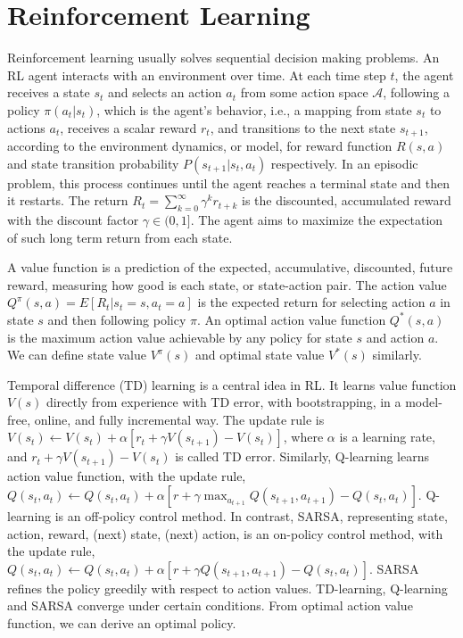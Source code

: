 \section{Reinforcement Learning}

Reinforcement learning usually solves sequential decision making problems. An RL agent interacts with an environment over time. At each time step $t$, the agent receives a state $s_t$ and selects an action $a_t$ from some action space $\mathcal{A}$, following a policy $\pi(a_t|s_t)$, which is the agent's behavior, i.e., a mapping from state $s_t$ to actions $a_t$, receives a scalar reward $r_t$, and transitions to the next state $s_{t+1}$, according to the environment dynamics, or model, for reward function $R(s,a)$ and state transition probability $P(s_{t+1}|s_t, a_t)$ respectively. In an episodic problem, this process continues until the agent reaches a terminal state and then it restarts. The return $R_t = \sum_{k=0}^{\infty} \gamma^k r_{t+k}$ is the discounted, accumulated reward with the discount factor $\gamma \in (0,1]$. The agent aims to maximize the expectation of such long term return from each state.     

A value function is a prediction of the expected, accumulative, discounted, future reward, measuring how good is each state, or state-action pair. The action value $Q^{\pi}(s, a) = E[R_t | s_t = s, a_t = a]$ is the expected return for selecting action $a$ in state $s$ and then following policy $\pi$. An optimal action value function $Q^{*}(s, a)$ is the maximum action value achievable by any policy for state $s$ and action $a$. We can define state value $V^{\pi}(s)$ and optimal state value $V^{*}(s)$ similarly.

Temporal difference (TD) learning is a central idea in RL. It learns value function $V(s)$ directly from experience with TD error, with bootstrapping, in a model-free, online, and fully incremental way.  The update rule is $V(s_t) \leftarrow V(s_t) + \alpha [r_t + \gamma V(s_{t+1}) - V(s_t)]$, where $\alpha$ is a learning rate, and $r_t + \gamma V(s_{t+1}) - V(s_t)$ is called TD error. Similarly, Q-learning learns action value function, with the update rule, $Q(s_t, a_t) \leftarrow Q(s_t, a_t) + \alpha [r + \gamma \max_{a_{t+1}}Q(s_{t+1}, a_{t+1}) - Q(s_t,a_t)]$. Q-learning is an off-policy control method. In contrast, SARSA, representing state, action, reward, (next) state, (next) action, is an on-policy control method, with the update rule, $Q(s_t, a_t) \leftarrow Q(s_t, a_t) + \alpha [r + \gamma Q(s_{t+1}, a_{t+1}) - Q(s_t,a_t)]$. SARSA refines the policy greedily with respect to action values. TD-learning, Q-learning and SARSA converge under certain conditions. From optimal action value function, we can derive an optimal policy. 

